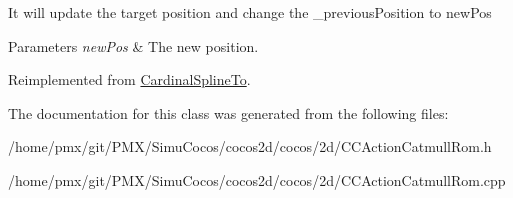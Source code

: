 It will update the target position and change the \+\_\+previous\+Position to new\+Pos


\begin{DoxyParams}{Parameters}
{\em new\+Pos} & The new position. \\
\hline
\end{DoxyParams}


Reimplemented from \hyperlink{classCardinalSplineTo_a18b90e37ad31dd48a7aaa611e6608369}{Cardinal\+Spline\+To}.



The documentation for this class was generated from the following files\+:\begin{DoxyCompactItemize}
\item 
/home/pmx/git/\+P\+M\+X/\+Simu\+Cocos/cocos2d/cocos/2d/C\+C\+Action\+Catmull\+Rom.\+h\item 
/home/pmx/git/\+P\+M\+X/\+Simu\+Cocos/cocos2d/cocos/2d/C\+C\+Action\+Catmull\+Rom.\+cpp\end{DoxyCompactItemize}
